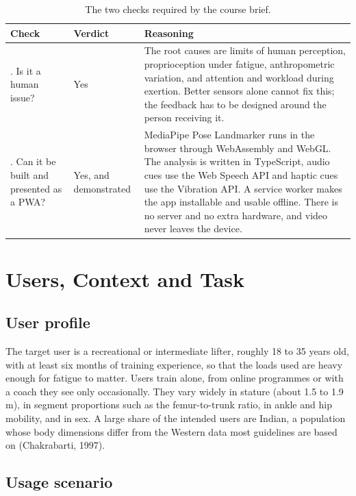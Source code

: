 \documentclass[12pt]{article}
\begin{document}
\begin{table}[!htbp]
\centering
\caption{The two checks required by the course brief.}
\begin{tabularx}{\textwidth}{>{\raggedright\arraybackslash}p{3.4cm} >{\raggedright\arraybackslash}p{2.2cm} L}
\toprule
\textbf{Check} & \textbf{Verdict} & \textbf{Reasoning} \\
. Is it a human issue? & Yes & The root causes are limits of human perception, proprioception under fatigue, anthropometric variation, and attention and workload during exertion. Better sensors alone cannot fix this; the feedback has to be designed around the person receiving it. \\
2. Can it be built and presented as a PWA? & Yes, and demonstrated & MediaPipe Pose Landmarker runs in the browser through WebAssembly and WebGL. The analysis is written in TypeScript, audio cues use the Web Speech API and haptic cues use the Vibration API. A service worker makes the app installable and usable offline. There is no server and no extra hardware, and video never leaves the device. \\
\bottomrule
\end{tabularx}
\end{table}

\section{Users, Context and Task}

\subsection{User profile}

The target user is a recreational or intermediate lifter, roughly 18 to 35 years old, with at least six months of training experience, so that the loads used are heavy enough for fatigue to matter. Users train alone, from online programmes or with a coach they see only occasionally. They vary widely in stature (about 1.5 to 1.9 m), in segment proportions such as the femur-to-trunk ratio, in ankle and hip mobility, and in sex. A large share of the intended users are Indian, a population whose body dimensions differ from the Western data most guidelines are based on (Chakrabarti, 1997).

\subsection{Usage scenario}
\end{document}
